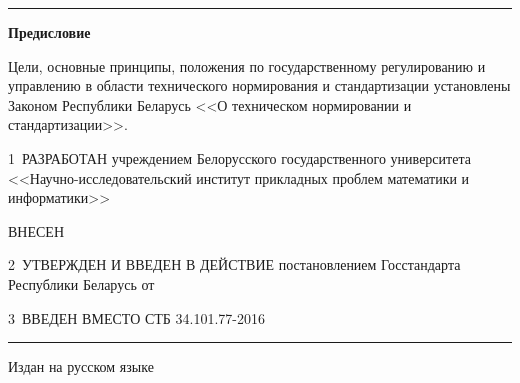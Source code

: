 \hrule

\rule{0pt}{5mm}

\centerline{\bf Предисловие} 

Цели, основные принципы, положения по государственному регулированию и 
управлению в области технического нормирования и стандартизации 
установлены Законом Республики Беларусь <<О техническом нормировании и 
стандартизации>>.  

\vskip0.2cm

1~РАЗРАБОТАН учреждением Белорусского государственного университета 
<<Науч\-но-исследовательский институт прикладных проблем математики и 
информатики>> 

ВНЕСЕН  

2~УТВЕРЖДЕН И ВВЕДЕН В ДЕЙСТВИЕ постановлением Госстандарта Республики 
Беларусь от $\phantom{\text{12 августа 2016 г.}}$ \No~$\phantom{\text{62}}$

3~ВВЕДЕН ВМЕСТО СТБ 34.101.77-2016

\vfill
\hrule
\vskip1mm
Издан на русском языке

\pagebreak
